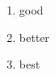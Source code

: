 \documentclass {minimal}
\begin{document}
\begin{enumerate}
  \item good
  \item better
  \item best
\end{enumerate}
\end{document}
